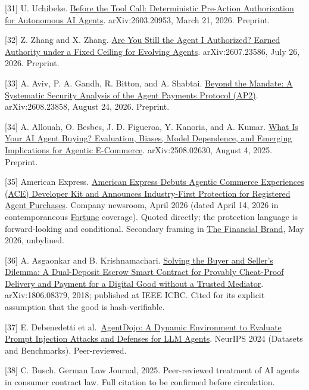 \documentclass[
  11pt,
  letterpaper,
]{article}
\begin{document}
{[}31{]} U. Uchibeke. \href{https://arxiv.org/abs/2603.20953}{Before the
Tool Call: Deterministic Pre-Action Authorization for Autonomous AI
Agents}. arXiv:2603.20953, March 21, 2026. Preprint.

{[}32{]} Z. Zhang and X. Zhang.
\href{https://arxiv.org/abs/2607.23586}{Are You Still the Agent I
Authorized? Earned Authority under a Fixed Ceiling for Evolving Agents}.
arXiv:2607.23586, July 26, 2026. Preprint.

{[}33{]} A. Aviv, P. A. Gandh, R. Bitton, and A. Shabtai.
\href{https://arxiv.org/abs/2608.23858}{Beyond the Mandate: A Systematic
Security Analysis of the Agent Payments Protocol (AP2)}.
arXiv:2608.23858, August 24, 2026. Preprint.

{[}34{]} A. Allouah, O. Besbes, J. D. Figueroa, Y. Kanoria, and A.
Kumar. \href{https://arxiv.org/abs/2508.02630}{What Is Your AI Agent
Buying? Evaluation, Biases, Model Dependence, and Emerging Implications
for Agentic E-Commerce}. arXiv:2508.02630, August 4, 2025. Preprint.

{[}35{]} American Express.
\href{https://www.americanexpress.com/en-us/newsroom/articles/innovation/american-express-debuts-agentic-commerce-experiences--ace--devel.html}{American
Express Debuts Agentic Commerce Experiences (ACE) Developer Kit and
Announces Industry-First Protection for Registered Agent Purchases}.
Company newsroom, April 2026 (dated April 14, 2026 in contemporaneous
\href{https://fortune.com/2026/04/14/american-express-ai-payments-developers-purchase-protection/}{Fortune}
coverage). Quoted directly; the protection language is forward-looking
and conditional. Secondary framing in
\href{https://thefinancialbrand.com/news/payments-trends/when-ai-agents-make-incorrect-purchases-whos-responsible-197147}{The
Financial Brand}, May 2026, unbylined.

{[}36{]} A. Asgaonkar and B. Krishnamachari.
\href{https://arxiv.org/abs/1806.08379}{Solving the Buyer and Seller's
Dilemma: A Dual-Deposit Escrow Smart Contract for Provably Cheat-Proof
Delivery and Payment for a Digital Good without a Trusted Mediator}.
arXiv:1806.08379, 2018; published at IEEE ICBC. Cited for its explicit
assumption that the good is hash-verifiable.

{[}37{]} E. Debenedetti et
al.~\href{https://arxiv.org/abs/2406.13352}{AgentDojo: A Dynamic
Environment to Evaluate Prompt Injection Attacks and Defenses for LLM
Agents}. NeurIPS 2024 (Datasets and Benchmarks). Peer-reviewed.

{[}38{]} C. Busch. German Law Journal, 2025. Peer-reviewed treatment of
AI agents in consumer contract law. Full citation to be confirmed before
circulation.
\end{document}
